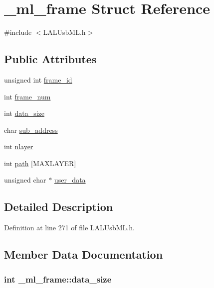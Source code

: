 \hypertarget{struct__ml__frame}{
\section{\_\-ml\_\-frame Struct Reference}
\label{struct__ml__frame}
}


{\ttfamily \#include $<$LALUsbML.h$>$}\subsection*{Public Attributes}
\begin{DoxyCompactItemize}
\item 
unsigned int \hyperlink{struct__ml__frame_a0c4a762a0c824490d209cd4705572eba}{frame\_\-id}
\item 
int \hyperlink{struct__ml__frame_ad91a6f0e37163fda1c1e1319fcac564d}{frame\_\-num}
\item 
int \hyperlink{struct__ml__frame_a30f2e0cf2d4d6693c8b6eadcbc5f72cd}{data\_\-size}
\item 
char \hyperlink{struct__ml__frame_a52d6a12345a0cc37bfc2d5c29e09d47b}{sub\_\-address}
\item 
int \hyperlink{struct__ml__frame_aae489f8d32e2a4d60ed976c44b8a4495}{nlayer}
\item 
int \hyperlink{struct__ml__frame_a16f43a5a0b9c1d56c2abeac26429ed54}{path} \mbox{[}MAXLAYER\mbox{]}
\item 
unsigned char $\ast$ \hyperlink{struct__ml__frame_a0bf29f8a45b29b63e8593dcfb2a15ff6}{user\_\-data}
\end{DoxyCompactItemize}


\subsection{Detailed Description}


Definition at line 271 of file LALUsbML.h.

\subsection{Member Data Documentation}
\hypertarget{struct__ml__frame_a30f2e0cf2d4d6693c8b6eadcbc5f72cd}{
\subsubsection[{data\_\-size}]{\setlength{\rightskip}{0pt plus 5cm}int {\bf \_\-ml\_\-frame::data\_\-size}}}
\label{struct__ml__frame_a30f2e0cf2d4d6693c8b6eadcbc5f72cd}


